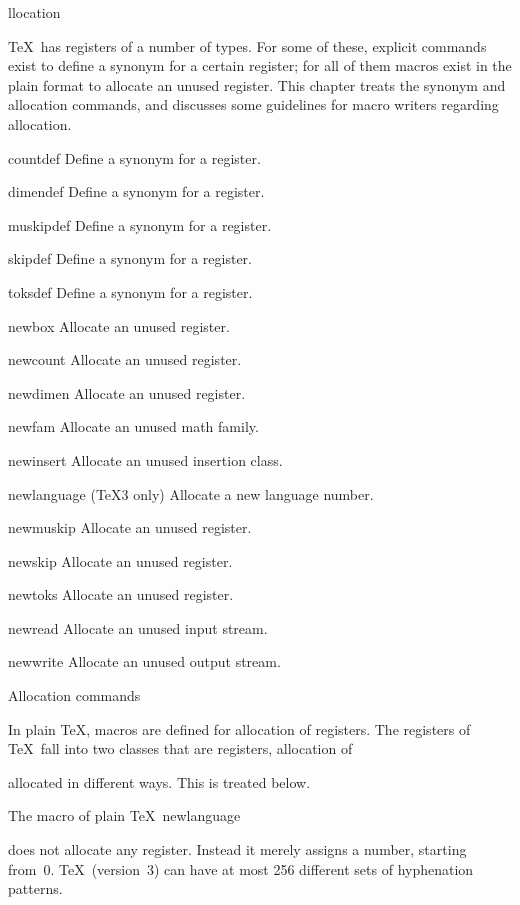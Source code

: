 \subject[alloc] Allocation

\TeX\ has registers of a number of types. For some of these,
explicit commands exist to define a synonym for a certain register;
for all of them macros exist in the plain format
to allocate an unused register. This chapter treats
the synonym and allocation commands, and discusses
some guidelines for macro writers regarding allocation.

\invent
\item countdef 
      Define a synonym for a  register.
\item dimendef
      Define a synonym for a  register.
\item muskipdef
      Define a synonym for a  register.
\item skipdef 
      Define a synonym for a  register.
\item toksdef 
      Define a synonym for a  register.
\item newbox
      Allocate an unused  register.
\item newcount
      Allocate an unused  register.
\item newdimen
      Allocate an unused  register.
\item newfam
      Allocate an unused math family.
\item newinsert
      Allocate an unused insertion class.
\item newlanguage
      (\TeX3 only)
      Allocate a new language number.
\item newmuskip
      Allocate an unused  register.
\item newskip
      Allocate an unused  register.
\item newtoks
      Allocate an unused  register.
\item newread
      Allocate an unused input stream.
\item newwrite
      Allocate an unused output stream.
\>

\point Allocation commands

In plain \TeX,  macros are defined for
allocation of registers.
The registers of \TeX\ fall into two classes that are 
\term registers, allocation of\par
allocated in different ways. This is treated below.

The  macro of plain \TeX\ 
\csterm newlanguage\par
does not allocate any register. Instead it merely assigns
a number, starting from~0.
\TeX\ (version~3) can have at most 256 different
sets of hyphenation patterns.

